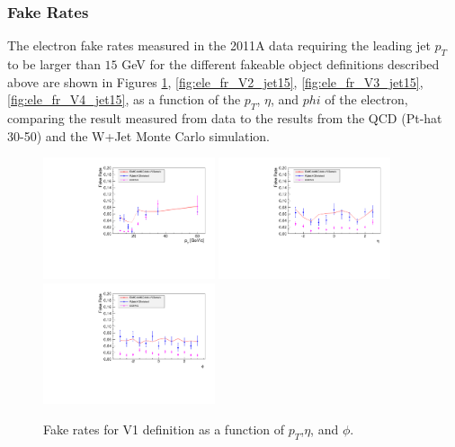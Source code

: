 \subsubsection{Fake Rates}
The electron fake rates measured in the 2011A data requiring the leading jet $p_{T}$ to be 
larger than $15$ GeV for the different fakeable object 
definitions described above are shown in Figures \ref{fig:ele_fr_V1_jet15},
\ref{fig:ele_fr_V2_jet15}, \ref{fig:ele_fr_V3_jet15}, \ref{fig:ele_fr_V4_jet15}, as a function of the 
$p_{T}$, $\eta$, and $phi$ of the electron, comparing the result measured from data to the
results from the QCD (Pt-hat 30-50) and the W+Jet Monte Carlo simulation.

\begin{figure}[!htbp]
\begin{center}
\includegraphics[width=0.45\textwidth]{figures/ElectronFakeRate_DenominatorV1_ptThreshold15_Pt.pdf}
\includegraphics[width=0.45\textwidth]{figures/ElectronFakeRate_DenominatorV1_ptThreshold15_Eta.pdf}
\includegraphics[width=0.45\textwidth]{figures/ElectronFakeRate_DenominatorV1_ptThreshold15_Phi.pdf}
\caption{Fake rates for V1 definition as a function of $p_T$,$\eta$, and $\phi$.}
\label{fig:ele_fr_V1_jet15}
\end{center}
\end{figure}

